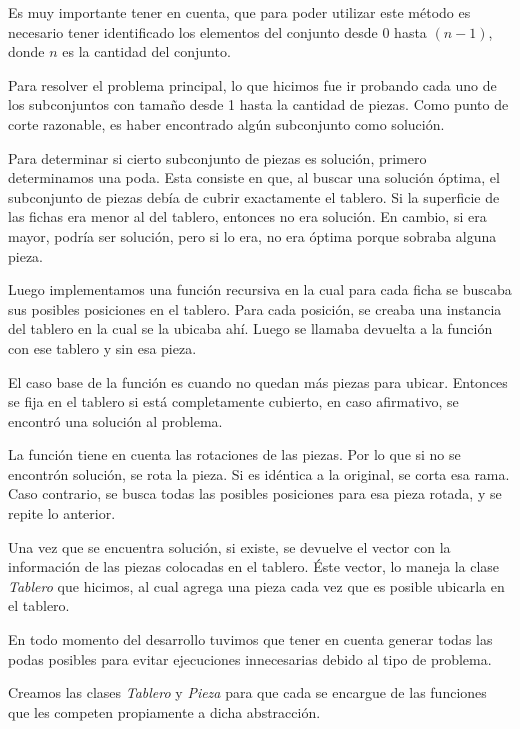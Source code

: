 \quad


\quad Es muy importante tener en cuenta, que para poder utilizar este m\'etodo es necesario tener identificado los elementos del conjunto desde 0 hasta $(n-1)$, donde $n$ es la cantidad del conjunto.

\quad Para resolver el problema principal, lo que hicimos fue ir probando cada uno de los subconjuntos con tama\~no desde 1 hasta la cantidad de piezas. Como punto de corte razonable, es haber encontrado alg\'un subconjunto como soluci\'on.

\quad Para determinar si cierto subconjunto de piezas es soluci\'on, primero determinamos una poda. Esta consiste en que, al buscar una soluci\'on \'optima, el subconjunto de piezas deb\'ia de cubrir exactamente el tablero. Si la superficie de las fichas era menor al del tablero, entonces no era soluci\'on. En cambio, si era mayor, podr\'ia ser soluci\'on, pero si lo era, no era \'optima porque sobraba alguna pieza. 

\quad Luego implementamos una funci\'on recursiva en la cual para cada ficha se buscaba sus posibles posiciones en el tablero. Para cada posici\'on, se creaba una instancia del tablero en la cual se la ubicaba ah\'i. Luego se llamaba devuelta a la funci\'on con ese tablero y sin esa pieza.

\quad El caso base de la funci\'on es cuando no quedan m\'as piezas para ubicar. Entonces se fija en el tablero si est\'a completamente cubierto, en caso afirmativo, se encontr\'o una soluci\'on al problema.

\quad La funci\'on tiene en cuenta las rotaciones de las piezas. Por lo que si no se encontr\'on soluci\'on, se rota la pieza. Si es id\'entica a la original, se corta esa rama. Caso contrario, se busca todas las posibles posiciones para esa pieza rotada, y se repite lo anterior.

\quad Una vez que se encuentra soluci\'on, si existe, se devuelve el vector con la informaci\'on de las piezas colocadas en el tablero. \'Este vector, lo maneja la clase \textit{Tablero} que hicimos, al cual agrega una pieza cada vez que es posible ubicarla en el tablero.

\quad En todo momento del desarrollo tuvimos que tener en cuenta generar todas las podas posibles para evitar ejecuciones innecesarias debido al tipo de problema.

\quad Creamos las clases \textit{Tablero} y \textit{Pieza} para que cada se encargue de las funciones que les competen propiamente a dicha abstracci\'on. 

